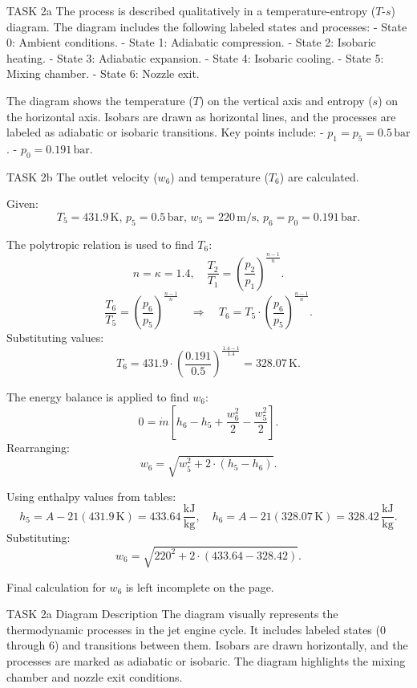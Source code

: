 TASK 2a  
The process is described qualitatively in a temperature-entropy (\( T \)-\( s \)) diagram. The diagram includes the following labeled states and processes:  
- State 0: Ambient conditions.  
- State 1: Adiabatic compression.  
- State 2: Isobaric heating.  
- State 3: Adiabatic expansion.  
- State 4: Isobaric cooling.  
- State 5: Mixing chamber.  
- State 6: Nozzle exit.  

The diagram shows the temperature (\( T \)) on the vertical axis and entropy (\( s \)) on the horizontal axis. Isobars are drawn as horizontal lines, and the processes are labeled as adiabatic or isobaric transitions. Key points include:  
- \( p_1 = p_5 = 0.5 \, \text{bar} \).  
- \( p_0 = 0.191 \, \text{bar} \).  

TASK 2b  
The outlet velocity (\( w_6 \)) and temperature (\( T_6 \)) are calculated.  

Given:  
\[
T_5 = 431.9 \, \text{K}, \, p_5 = 0.5 \, \text{bar}, \, w_5 = 220 \, \text{m/s}, \, p_6 = p_0 = 0.191 \, \text{bar}.
\]  

The polytropic relation is used to find \( T_6 \):  
\[
n = \kappa = 1.4, \quad \frac{T_2}{T_1} = \left( \frac{p_2}{p_1} \right)^{\frac{n-1}{n}}.
\]  
\[
\frac{T_6}{T_5} = \left( \frac{p_6}{p_5} \right)^{\frac{n-1}{n}} \quad \Rightarrow \quad T_6 = T_5 \cdot \left( \frac{p_6}{p_5} \right)^{\frac{n-1}{n}}.
\]  
Substituting values:  
\[
T_6 = 431.9 \cdot \left( \frac{0.191}{0.5} \right)^{\frac{1.4-1}{1.4}} = 328.07 \, \text{K}.
\]  

The energy balance is applied to find \( w_6 \):  
\[
0 = \dot{m} \left[ h_6 - h_5 + \frac{w_6^2}{2} - \frac{w_5^2}{2} \right].
\]  
Rearranging:  
\[
w_6 = \sqrt{w_5^2 + 2 \cdot (h_5 - h_6)}.
\]  

Using enthalpy values from tables:  
\[
h_5 = A-21(431.9 \, \text{K}) = 433.64 \, \frac{\text{kJ}}{\text{kg}}, \quad h_6 = A-21(328.07 \, \text{K}) = 328.42 \, \frac{\text{kJ}}{\text{kg}}.
\]  
Substituting:  
\[
w_6 = \sqrt{220^2 + 2 \cdot (433.64 - 328.42)}.
\]  

Final calculation for \( w_6 \) is left incomplete on the page.  

TASK 2a Diagram Description  
The diagram visually represents the thermodynamic processes in the jet engine cycle. It includes labeled states (0 through 6) and transitions between them. Isobars are drawn horizontally, and the processes are marked as adiabatic or isobaric. The diagram highlights the mixing chamber and nozzle exit conditions.